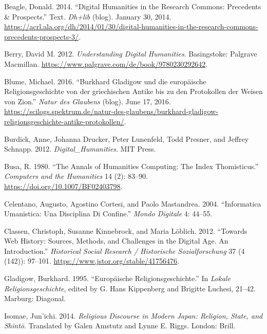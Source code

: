 \documentclass[
  english,
  a4paper,
  DIV=12,
  footlines=2.1,
  usegeometry=true]{scrartcl}
\newlength{\cslhangindent}
\newenvironment{cslreferences}%
  {\setlength{\parindent}{0pt}%
  \everypar{\setlength{\hangindent}{\cslhangindent}}\ignorespaces}%
  {\par}
\begin{document}
\hypertarget{refs}{}
\begin{cslreferences}
\leavevmode\hypertarget{ref-beagle_digital_2014}{}%
Beagle, Donald. 2014. ``Digital Humanities in the Research Commons:
Precedents \& Prospects.'' Text. \emph{Dh+lib} (blog). January 30, 2014.
\url{https://acrl.ala.org/dh/2014/01/30/digital-humanities-in-the-research-commons-precedents-prospects-3/}.

\leavevmode\hypertarget{ref-berry_understanding_2012}{}%
Berry, David M. 2012. \emph{Understanding Digital Humanities}.
Basingstoke: Palgrave Macmillan.
\url{https://www.palgrave.com/de/book/9780230292642}.

\leavevmode\hypertarget{ref-blume_burkhard_2016}{}%
Blume, Michael. 2016. ``Burkhard Gladigow und die europäische
Religionsgeschichte von der griechischen Antike bis zu den Protokollen
der Weisen von Zion.'' \emph{Natur des Glaubens} (blog). June 17, 2016.
\url{https://scilogs.spektrum.de/natur-des-glaubens/burkhard-gladigow-religionsgeschichte-antike-protokollen/}.

\leavevmode\hypertarget{ref-burdick_digital_humanities_2012}{}%
Burdick, Anne, Johanna Drucker, Peter Lunenfeld, Todd Presner, and
Jeffrey Schnapp. 2012. \emph{Digital\_Humanities}. MIT Press.

\leavevmode\hypertarget{ref-busa_annals_1980}{}%
Busa, R. 1980. ``The Annals of Humanities Computing: The Index
Thomisticus.'' \emph{Computers and the Humanities} 14 (2): 83--90.
\url{https://doi.org/10.1007/BF02403798}.

\leavevmode\hypertarget{ref-celentano_informatica_2004}{}%
Celentano, Augusto, Agostino Cortesi, and Paolo Mastandrea. 2004.
``Informatica Umanistica: Una Disciplina Di Confine.'' \emph{Mondo
Digitale} 4: 44--55.

\leavevmode\hypertarget{ref-classen_towards_2012}{}%
Classen, Christoph, Susanne Kinnebrock, and Maria Löblich. 2012.
``Towards Web History: Sources, Methods, and Challenges in the Digital
Age. An Introduction.'' \emph{Historical Social Research / Historische
Sozialforschung} 37 (4 (142)): 97--101.
\url{https://www.jstor.org/stable/41756476}.

\leavevmode\hypertarget{ref-gladigow_europaische_1995}{}%
Gladigow, Burkhard. 1995. ``Europäische Religionsgeschichte.'' In
\emph{Lokale Religionsgeschichte}, edited by G. Hans Kippenberg and
Brigitte Luchesi, 21--42. Marburg: Diagonal.

\leavevmode\hypertarget{ref-isomae_religious_2014}{}%
Isomae, Jun'ichi. 2014. \emph{Religious Discourse in Modern Japan:
Religion, State, and Shintō}. Translated by Galen Amstutz and Lynne E.
Riggs. London: Brill.


\end{cslreferences}
\end{document}

